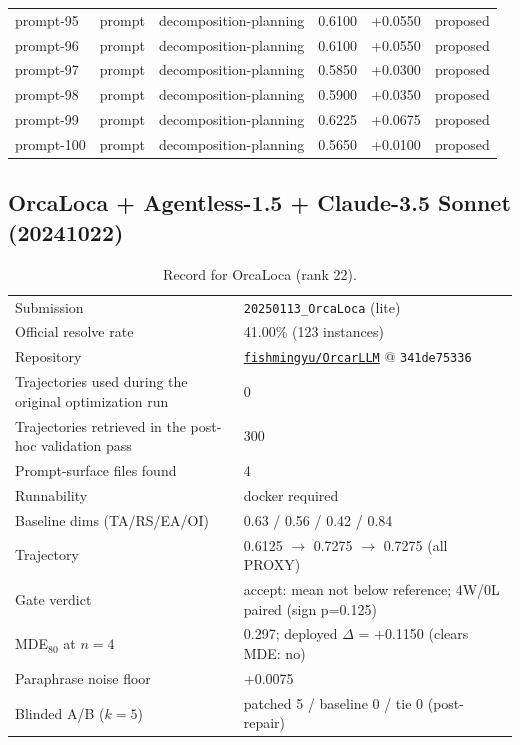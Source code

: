 \begin{center}
\begin{longtable}{llp{5.2cm}rrl}
prompt-95 & prompt & decomposition-planning & 0.6100 & +0.0550 & proposed \\
prompt-96 & prompt & decomposition-planning & 0.6100 & +0.0550 & proposed \\
prompt-97 & prompt & decomposition-planning & 0.5850 & +0.0300 & proposed \\
prompt-98 & prompt & decomposition-planning & 0.5900 & +0.0350 & proposed \\
prompt-99 & prompt & decomposition-planning & 0.6225 & +0.0675 & proposed \\
prompt-100 & prompt & decomposition-planning & 0.5650 & +0.0100 & proposed \\
\bottomrule\end{longtable}\end{center}
\clearpage
\subsection{OrcaLoca + Agentless-1.5 + Claude-3.5 Sonnet (20241022)}
\label{app:agent22}
\begin{table}[h]\centering\scriptsize
\caption{Record for OrcaLoca (rank 22).}
\begin{tabular}{lp{8.2cm}}\toprule
Submission & \texttt{20250113\_\allowbreak{}OrcaLoca} (lite) \\
Official resolve rate & 41.00\% (123 instances) \\
Repository & \href{https://github.com/fishmingyu/OrcarLLM}{\texttt{fishmingyu/OrcarLLM}} @ \texttt{341de75336} \\
Trajectories used during the original optimization run & 0 \\
Trajectories retrieved in the post-hoc validation pass & 300 \\
Prompt-surface files found & 4 \\
Runnability & docker required \\
Baseline dims (TA/RS/EA/OI) & 0.63 / 0.56 / 0.42 / 0.84 \\
Trajectory & 0.6125 $\to$ 0.7275 $\to$ 0.7275 (all PROXY) \\
Gate verdict & accept: mean not below reference; 4W/0L paired (sign p=0.125) \\
MDE$_{80}$ at $n{=}4$ & 0.297; deployed $\Delta$ = +0.1150 (clears MDE: no) \\
Paraphrase noise floor & +0.0075 \\
Blinded A/B ($k{=}5$) & patched 5 / baseline 0 / tie 0 (post-repair) \\
\bottomrule\end{tabular}\end{table}
